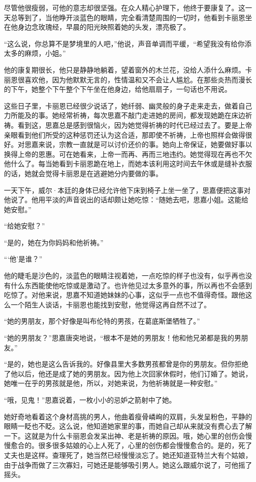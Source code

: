 \par 尽管他很瘦弱，可他的意志却很坚强。在众人精心护理下，他终于要康复了。这一天总等到了，当他睁开淡蓝色的眼睛，完全看清楚周围的一切时，他看到卡丽恩坐在他身边念玫瑰经，早晨的阳光映照着她的头发，漂亮极了。
\par “这么说，你总算不是梦境里的人吧，”他说，声音单调而平缓，“希望我没有给你添太多的麻烦，小姐。”
\par 他的康复期很长，他只是静静地躺着，望着窗外的木兰花，没给人添什么麻烦。卡丽恩很喜欢他，因为他默默无言的，性情温和又不会让人尴尬。在那些炎热而漫长的下午，她整个下午整个下午坐在他身边，给他扇扇子，一句话也不用说。
\par 这些日子里，卡丽恩已经很少说话了，她纤弱、幽灵般的身子走来走去，做着自己力所能及的事。她经常祈祷，每次思嘉不敲门走进她的房间，都发现她跪在床边祈祷。看到这，思嘉总是感到很恼火，因为她觉得祈祷的时代已经过去了。要是上帝亲眼看到他们所受的这种惩罚还认为这合适，那即使不祈祷，上帝也照样会做得很好。对思嘉来说，宗教一直就是可以讨价还价的事。她向上帝保证，她要做好事以换得上帝的恩惠。可在她看来，上帝一而再、再而三地违约。她觉得现在再也不欠他什么了。每当她看到卡丽恩跪在地上，而她本该利用这时间去午休或是缝补衣服的话，她就会觉得卡丽恩是在逃避她分内要做的事。
\par 一天下午，威尔·本廷的身体已经允许他下床到椅子上坐一坐了，思嘉便把这事对他说了。他用平淡的声音说出的话却颇让她吃惊：“随她去吧，思嘉小姐。这能给她安慰。”
\par “给她安慰？”
\par “是的，她在为你妈妈和他祈祷。”
\par “‘他’是谁？”
\par 他的睫毛是沙色的，淡蓝色的眼睛注视着她，一点吃惊的样子也没有，似乎再也没有什么东西能使他吃惊或是激动了。也许他见过太多意外的事，所以再也不会感到吃惊了。对他来说，思嘉不知道她妹妹的心事，这似乎一点也不值得奇怪。跟他这么一个陌生人谈话，卡丽恩也能找到安慰，他觉得这再自然不过了。
\par “她的男朋友，那个好像是叫布伦特的男孩，在葛底斯堡牺牲了。”
\par “她的男朋友？”思嘉唐突地说，“根本不是她的男朋友！他和他兄弟都是我的男朋友。”
\par “是的，她也是这么告诉我的。好像县里大多数男孩都曾是你的男朋友。但你拒绝了他以后，他还是成了她的男朋友。因为他上次回家休假时，他们订婚了。她说，她唯一在乎的男孩就是他，所以，对她来说，为他祈祷就是一种安慰。”
\par “哦，见鬼！”思嘉说着，一枚小小的忌妒之箭射中了她。
\par 她好奇地看着这个身材高挑的男人，他曲着瘦骨嶙峋的双肩，头发呈粉色，平静的眼睛一眨也不眨。这么说，他知道她家里的事，而她自己却从来就没有费心去了解一下。这就是为什么卡丽恩会发呆出神、老是祈祷的原因。哦，她心里的创伤会慢慢愈合的。很多很多姑娘的心上人死了，心里的创伤都会慢慢愈合的。是的，死了丈夫也是这样。查理死了，她当然已经慢慢淡忘了。她还知道亚特兰大有个姑娘，由于战争而做了三次寡妇，可她还是能够吸引男人。她这么跟威尔说了，可他摇了摇头。
